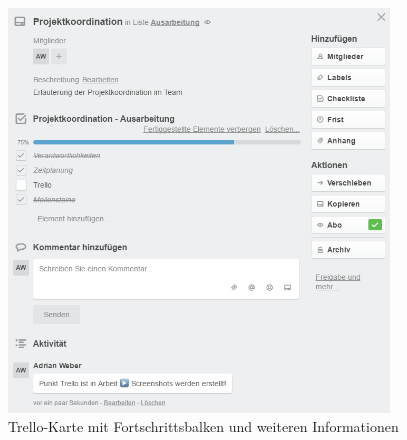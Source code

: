 \begin{figure}[hp] 
  \centering
     \includegraphics[width=0.9\textwidth]{images/KarteProjektkoordination.PNG}
  \caption{Trello-Karte mit Fortschrittsbalken und weiteren Informationen}
  \label{fig:Trello-Karte mit Fortschrittsbalken, Kommentar und weiteren Informationen}
\end{figure}